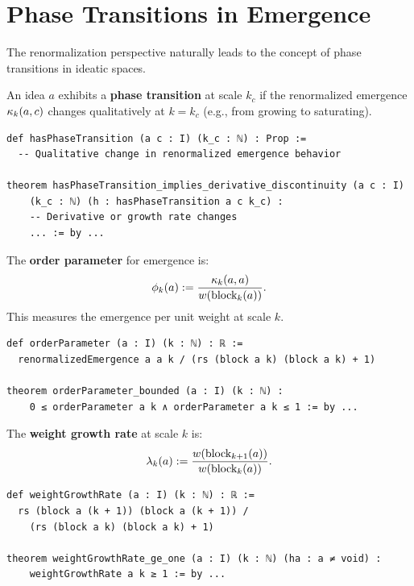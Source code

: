 \section{Phase Transitions in Emergence}

The renormalization perspective naturally leads to the concept of phase transitions
in ideatic spaces.

\begin{definition}
\label{def:phase-transition}
An idea $a$ exhibits a \textbf{phase transition} at scale $k_c$ if the
renormalized emergence $\kappa_k(a,c)$ changes qualitatively at $k = k_c$
(e.g., from growing to saturating).
\end{definition}

\begin{lstlisting}[caption={Phase transition (IDT\_v3\_Emergence.lean)}]
def hasPhaseTransition (a c : I) (k_c : ℕ) : Prop :=
  -- Qualitative change in renormalized emergence behavior

theorem hasPhaseTransition_implies_derivative_discontinuity (a c : I)
    (k_c : ℕ) (h : hasPhaseTransition a c k_c) :
    -- Derivative or growth rate changes
    ... := by ...
\end{lstlisting}

\begin{definition}
\label{def:order-parameter}
The \textbf{order parameter} for emergence is:
\[
  \phi_k(a) := \frac{\kappa_k(a,a)}{w(\text{block}_k(a))}.
\]
This measures the emergence per unit weight at scale $k$.
\end{definition}

\begin{lstlisting}[caption={Order parameter (IDT\_v3\_Emergence.lean)}]
def orderParameter (a : I) (k : ℕ) : ℝ :=
  renormalizedEmergence a a k / (rs (block a k) (block a k) + 1)

theorem orderParameter_bounded (a : I) (k : ℕ) :
    0 ≤ orderParameter a k ∧ orderParameter a k ≤ 1 := by ...
\end{lstlisting}

\begin{definition}
\label{def:weight-growth-rate}
The \textbf{weight growth rate} at scale $k$ is:
\[
  \lambda_k(a) := \frac{w(\text{block}_{k+1}(a))}{w(\text{block}_k(a))}.
\]
\end{definition}

\begin{lstlisting}[caption={Weight growth rate (IDT\_v3\_Emergence.lean)}]
def weightGrowthRate (a : I) (k : ℕ) : ℝ :=
  rs (block a (k + 1)) (block a (k + 1)) /
    (rs (block a k) (block a k) + 1)

theorem weightGrowthRate_ge_one (a : I) (k : ℕ) (ha : a ≠ void) :
    weightGrowthRate a k ≥ 1 := by ...
\end{lstlisting}

